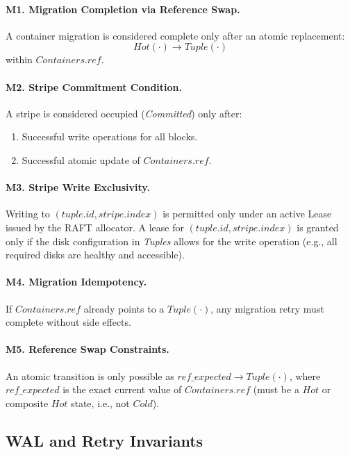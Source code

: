 \documentclass[a4paper,12pt]{article}
\begin{document}
    \paragraph{M1. Migration Completion via Reference Swap.}
    A container migration is considered complete only after an atomic replacement:
    \[
        Hot(\cdot) \rightarrow Tuple(\cdot)
    \]
    within $Containers.ref$.

    \paragraph{M2. Stripe Commitment Condition.}
    A stripe is considered occupied (\textit{Committed}) only after:
    \begin{enumerate}
        \item Successful write operations for all blocks.
        \item Successful atomic update of $Containers.ref$.
    \end{enumerate}

    \paragraph{M3. Stripe Write Exclusivity.}
    Writing to $(tuple.id, stripe.index)$ is permitted only under an active Lease issued by the RAFT allocator. A lease for $(tuple.id, stripe.index)$ is granted only if the disk configuration in \textit{Tuples} allows for the write operation (e.g., all required disks are healthy and accessible).

    \paragraph{M4. Migration Idempotency.}
    If $Containers.ref$ already points to a $Tuple(\cdot)$, any migration retry must complete without side effects.

    \paragraph{M5. Reference Swap Constraints.}
    An atomic transition is only possible as $ref\_expected \rightarrow Tuple(\cdot)$, where $ref\_expected$ is the exact current value of $Containers.ref$ (must be a $Hot$ or composite $Hot$ state, i.e., not $Cold$).

    \subsection{WAL and Retry Invariants}
\end{document}
